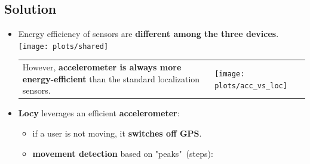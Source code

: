 \documentclass[a2,landscape]{a0poster}
\begin{document}
\mbox{}\framebreak
\begin{center}
\section*{Solution}
\end{center}
\begin{itemize}
   \item Energy efficiency of sensors are \textbf{different among the three devices}.\\
   \texttt{[image: plots/shared]}

\vspace{0.35cm}
 \begin{tabular}[t]{p{8.0cm} p{9.0cm}}
       \vspace{0cm} However, \textbf{accelerometer is always more energy-efficient} than the standard localization sensors. & \vspace{0cm}\texttt{[image: plots/acc\_vs\_loc]}
      \end{tabular}

   \item \textbf{Locy} leverages an efficient \textbf{accelerometer}:
  	   \begin{itemize}		
  	   \item if a user is not moving, it \textbf{switches off GPS}. 
  	   \item \textbf{movement detection} based on "peaks"\ (steps):
  	   

\end{itemize}
\end{itemize}
\end{document}
